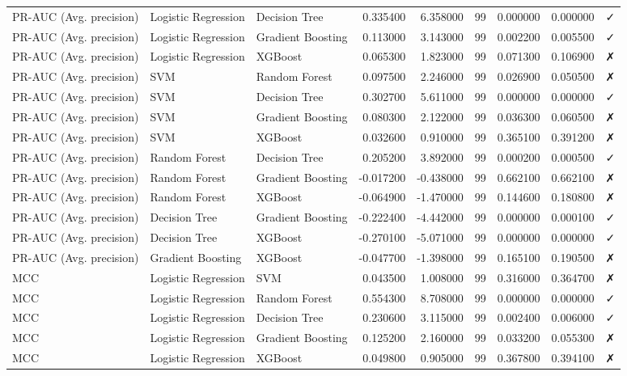 \begin{table}
\begin{tabular}{lllrrrrrl}
PR-AUC (Avg. precision) & Logistic Regression & Decision Tree & 0.335400 & 6.358000 & 99 & 0.000000 & 0.000000 & ✓ \\
PR-AUC (Avg. precision) & Logistic Regression & Gradient Boosting & 0.113000 & 3.143000 & 99 & 0.002200 & 0.005500 & ✓ \\
PR-AUC (Avg. precision) & Logistic Regression & XGBoost & 0.065300 & 1.823000 & 99 & 0.071300 & 0.106900 & ✗ \\
PR-AUC (Avg. precision) & SVM & Random Forest & 0.097500 & 2.246000 & 99 & 0.026900 & 0.050500 & ✗ \\
PR-AUC (Avg. precision) & SVM & Decision Tree & 0.302700 & 5.611000 & 99 & 0.000000 & 0.000000 & ✓ \\
PR-AUC (Avg. precision) & SVM & Gradient Boosting & 0.080300 & 2.122000 & 99 & 0.036300 & 0.060500 & ✗ \\
PR-AUC (Avg. precision) & SVM & XGBoost & 0.032600 & 0.910000 & 99 & 0.365100 & 0.391200 & ✗ \\
PR-AUC (Avg. precision) & Random Forest & Decision Tree & 0.205200 & 3.892000 & 99 & 0.000200 & 0.000500 & ✓ \\
PR-AUC (Avg. precision) & Random Forest & Gradient Boosting & -0.017200 & -0.438000 & 99 & 0.662100 & 0.662100 & ✗ \\
PR-AUC (Avg. precision) & Random Forest & XGBoost & -0.064900 & -1.470000 & 99 & 0.144600 & 0.180800 & ✗ \\
PR-AUC (Avg. precision) & Decision Tree & Gradient Boosting & -0.222400 & -4.442000 & 99 & 0.000000 & 0.000100 & ✓ \\
PR-AUC (Avg. precision) & Decision Tree & XGBoost & -0.270100 & -5.071000 & 99 & 0.000000 & 0.000000 & ✓ \\
PR-AUC (Avg. precision) & Gradient Boosting & XGBoost & -0.047700 & -1.398000 & 99 & 0.165100 & 0.190500 & ✗ \\
MCC & Logistic Regression & SVM & 0.043500 & 1.008000 & 99 & 0.316000 & 0.364700 & ✗ \\
MCC & Logistic Regression & Random Forest & 0.554300 & 8.708000 & 99 & 0.000000 & 0.000000 & ✓ \\
MCC & Logistic Regression & Decision Tree & 0.230600 & 3.115000 & 99 & 0.002400 & 0.006000 & ✓ \\
MCC & Logistic Regression & Gradient Boosting & 0.125200 & 2.160000 & 99 & 0.033200 & 0.055300 & ✗ \\
MCC & Logistic Regression & XGBoost & 0.049800 & 0.905000 & 99 & 0.367800 & 0.394100 & ✗ \\

\end{tabular}
\end{table}
